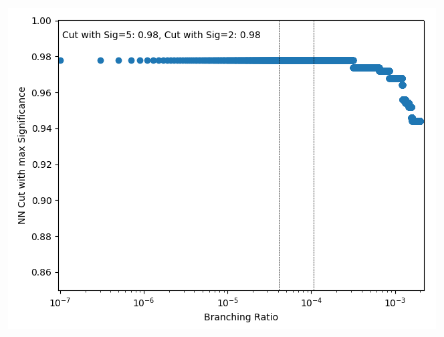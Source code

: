 \documentclass[10pt]{beamer}
\begin{document}
{\begin{columns}
\begin{column}{0.48\textwidth}
\includegraphics[width=0.85\textwidth]{Images/ejetsOuts/CutVsBR.png} 
\end{column}
\end{columns}
}
\end{document}
